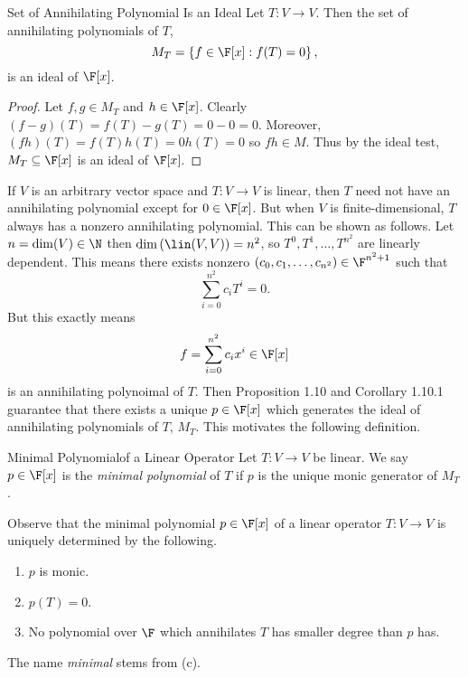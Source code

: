 \documentclass[linearalgebraII]{subfiles}
\begin{document}
    \begin{prop}{Set of Annihilating Polynomial Is an Ideal}
        Let $T:V\to V$. Then the set of annihilating polynomials of $T$,
        \begin{equation*}
            M_T = \left\lbrace f\in\F[x]:f(T)=0 \right\rbrace ,
        \end{equation*}
        is an ideal of $\F[x]$.
    \end{prop}

    \begin{proof}
        Let $f,g\in M_T$ and $h\in \F[x]$. Clearly $(f-g)(T) = f(T)-g(T) = 0 - 0 = 0$. Moreover, $(fh)(T) = f(T)h(T) = 0h(T) = 0$ so $fh\in M$. Thus by the ideal test, $M_T\subseteq\F[x]$ is an ideal of $\F[x]$.
    \end{proof}

    \begin{remark}
        If $V$ is an arbitrary vector space and $T:V\to V$ is linear, then $T$ need not have an annihilating polynomial except for $0\in\F[x]$. But when $V$ is finite-dimensional, $T$ always has a nonzero annihilating polynomial. This can be shown as follows. Let $n=\dim(V)\in\N$ then $\dim\left( \lin(V,V) \right) = n^2$, so $T^0, T^1, \ldots, T^{n^2}$ are linearly dependent. This means there exists nonzero $\left( c_0,c_1,\ldots,c_{n^2} \right) \in\F^{n^2+1}$ such that
        \begin{equation*}
            \sum^{n^2}_{i=0} c_iT^i = 0.
        \end{equation*}
        But this exactly means
        \begin{equation*}
            f = \sum^{n^2}_{i=0} c_ix^i \in\F[x]
        \end{equation*}
        is an annihilating polynoimal of $T$. Then Proposition 1.10 and Corollary 1.10.1 guarantee that there exists a unique $p\in\F[x]$ which generates the ideal of annihilating polynomials of $T$, $M_T$. This motivates the following definition.
    \end{remark}

    \begin{definition}{Minimal Polynomial}{of a Linear Operator}
        Let $T:V\to V$ be linear. We say $p\in\F[x]$ is the \emph{minimal polynomial} of $T$ if $p$ is the unique monic generator of $M_T$.
    \end{definition}

    \begin{remark}
        Observe that the minimal polynomial $p\in\F[x]$ of a linear operator $T:V\to V$ is uniquely determined by the following.
        \begin{enumerate}
            \item $p$ is monic.
            \item $p(T)=0$.
            \item No polynomial over $\F$ which annihilates $T$ has smaller degree than $p$ has.
        \end{enumerate}
        The name \textit{minimal} stems from (c).
    \end{remark}
\end{document}
